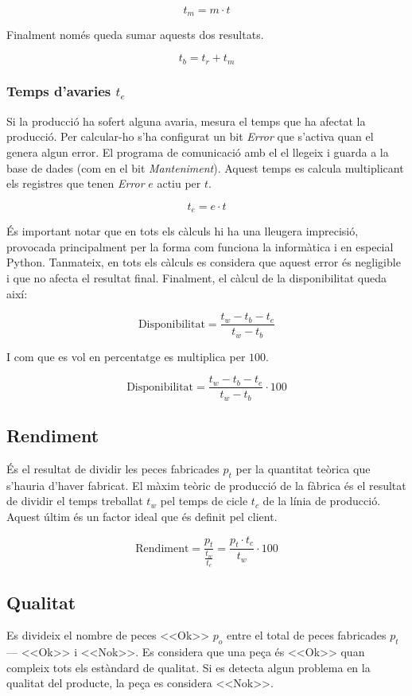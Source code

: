 \documentclass{tfgitic}[2022/06/30]
\begin{document}
\[t_{m} = m \cdot t\]

Finalment només queda sumar aquests dos resultats.

\[t_{b} = t_{r} + t_{m}\]

\subsubsection{Temps d'avaries $t_{e}$}
Si la producció ha sofert alguna avaria, mesura el temps que ha afectat la producció. Per calcular-ho s'ha configurat un bit \emph{Error} que s'activa quan el  genera algun error. El programa de comunicació amb el  el llegeix i guarda a la base de dades (com en el bit \emph{Manteniment}). Aquest temps es calcula multiplicant els registres que tenen \emph{Error} $e$ actiu per $t$.

\[t_{e} = e \cdot t\]

És important notar que en tots els càlculs hi ha una lleugera imprecisió, provocada principalment per la forma com funciona la informàtica i en especial Python. Tanmateix, en tots els càlculs es considera que aquest error és negligible i que no afecta el resultat final. Finalment, el càlcul de la disponibilitat queda així:

\[\textrm{Disponibilitat} = \frac{t_{w} - t_{b} - t_{e}}{t_{w} - t_{b}}\]

I com que es vol en percentatge es multiplica per $100$.

\[\textrm{Disponibilitat} = \frac{t_{w} - t_{b} - t_{e}}{t_{w} - t_{b}} \cdot 100\]

\subsection{Rendiment}
És el resultat de dividir les peces fabricades $p_{t}$ per la quantitat teòrica que s'hauria d'haver fabricat. El màxim teòric de producció de la fàbrica és el resultat de dividir el temps treballat $t_{w}$ pel temps de cicle $t_c$ de la línia de producció. Aquest últim és un factor ideal que és definit pel client.

\[\textrm{Rendiment} = \frac{p_{t}}{\frac{t_{w}}{t_{c}}} = \frac{p_{t} \cdot t_{c}}{t_{w}} \cdot 100\]

\subsection{Qualitat}
Es divideix el nombre de peces <<Ok>> $p_{o}$ entre el total de peces fabricades $p_{t}$ --- <<Ok>> i <<Nok>>. Es considera que una peça és <<Ok>> quan compleix tots els estàndard de qualitat. Si es detecta algun problema en la qualitat del producte, la peça es considera <<Nok>>.
\end{document}
